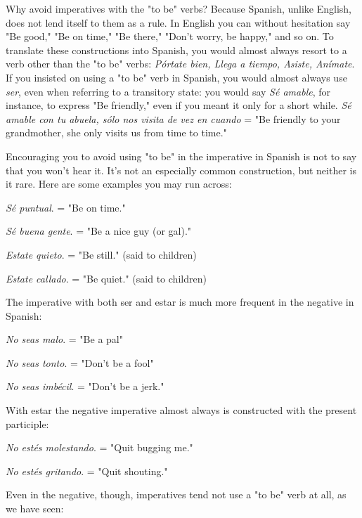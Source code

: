 \documentclass[14pt,a4paper,oneside]{memoir}
\newcommand{\bsk}{\vspace{20pt}}
\newcommand{\indu}{\hspace{20pt}}
\begin{document}
Why avoid imperatives with the "to be" verbs? Because Spanish, unlike English, does not lend itself to them as a rule. In English
you can without hesitation say "Be good," "Be on time," "Be there,"
"Don't worry, be happy," and so on. To translate these constructions
into Spanish, you would almost always resort to a verb other than the
"to be" verbs: \emph{Pórtate bien, Llega a tiempo, Asiste, Anímate}. If you
insisted on using a "to be" verb in Spanish, you would almost always
use \emph{ser}, even when referring to a transitory state: you would say \emph{Sé
amable}, for instance, to express "Be friendly," even if you meant it
only for a short while. \emph{Sé amable con tu abuela, sólo nos visita de vez
en cuando} = "Be friendly to your grandmother, she only visits us from
time to time."

Encouraging you to avoid using "to be" in the imperative in
Spanish is not to say that you won't hear it. It's not an especially common construction, but neither is it rare. Here are some examples you
may run across:

\bsk

\indu \emph{Sé puntual}. = "Be on time."

\indu \emph{Sé buena gente}. = "Be a nice guy (or gal)."

\indu \emph{Estate quieto}. = "Be still." (said to children)

\indu \emph{Estate callado}. = "Be quiet." (said to children)

\bsk

The imperative with both ser and estar is much more frequent
in the negative in Spanish:

\bsk

\indu \emph{No seas malo}. = "Be a pal"

\indu \emph{No seas tonto}. = "Don't be a fool"

\indu \emph{No seas imbécil}. = "Don't be a jerk."

\bsk

With estar the negative imperative almost always is constructed with the present participle:

\bsk

\indu \emph{No estés molestando}. = "Quit bugging me."

\indu \emph{No estés gritando}. = "Quit shouting."

\bsk

Even in the negative, though, imperatives tend not use a "to
be" verb at all, as we have seen:
\end{document}
